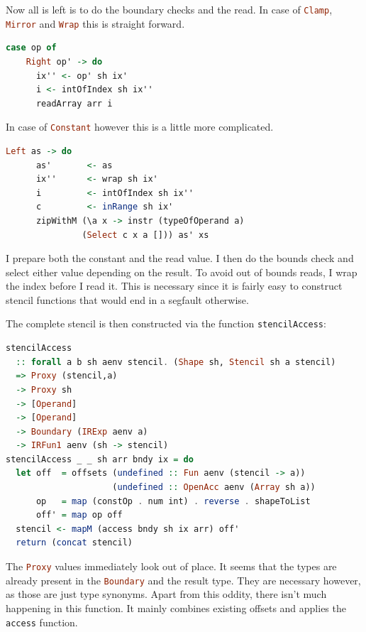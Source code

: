 \documentclass[a4paper,bibliography=totocnumbered,parskip,headsepline]{scrbook}
\begin{document}
Now all is left is to do the boundary checks and the read.
In case of \lstinline[language=haskell]!Clamp!, \lstinline[language=haskell]!Mirror! and \lstinline[language=haskell]!Wrap! this is straight forward.
\begin{lstlisting}[language=haskell]
  case op of
    Right op' -> do
      ix'' <- op' sh ix'
      i <- intOfIndex sh ix''
      readArray arr i
\end{lstlisting}
In case of \lstinline[language=haskell]!Constant! however this is a little more complicated.
\begin{lstlisting}[language=haskell]
    Left as -> do
      as'       <- as
      ix''      <- wrap sh ix'
      i         <- intOfIndex sh ix''
      c         <- inRange sh ix'
      zipWithM (\a x -> instr (typeOfOperand a)
               (Select c x a [])) as' xs
\end{lstlisting}

\newpage
I prepare both the constant and the read value.
I then do the bounds check and select either value depending on the result.
To avoid out of bounds reads, I wrap the index before I read it.
This is necessary since it is fairly easy to construct stencil functions that would end in a segfault otherwise.


\begin{minipage}{\textwidth}
The complete stencil is then constructed via the function \lstinline[language=haskell]!stencilAccess!:
\begin{lstlisting}[language=haskell]
stencilAccess
  :: forall a b sh aenv stencil. (Shape sh, Stencil sh a stencil)
  => Proxy (stencil,a)
  -> Proxy sh
  -> [Operand]
  -> [Operand]
  -> Boundary (IRExp aenv a)
  -> IRFun1 aenv (sh -> stencil)
stencilAccess _ _ sh arr bndy ix = do
  let off  = offsets (undefined :: Fun aenv (stencil -> a))
                     (undefined :: OpenAcc aenv (Array sh a))
      op   = map (constOp . num int) . reverse . shapeToList
      off' = map op off
  stencil <- mapM (access bndy sh ix arr) off'
  return (concat stencil)
\end{lstlisting}
\end{minipage}

The \lstinline[language=haskell]!Proxy! values immediately look out of place.
It seems that the types are already present in the \lstinline[language=haskell]!Boundary! and the result type.
They are necessary however, as those are just type synonyms.
Apart from this oddity, there isn't much happening in this function.
It mainly combines existing offsets and applies the \lstinline[language=haskell]!access! function.
\end{document}
